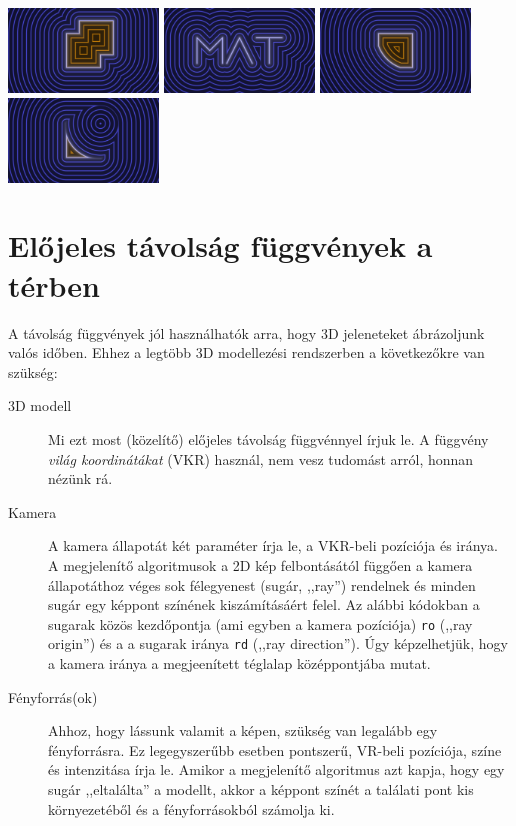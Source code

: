 \begin{center}
  \hfill
\includegraphics[width=4cm]{images/f26_a.png}\hfill
\includegraphics[width=4cm]{images/f26_aa.png}\hfill
\includegraphics[width=4cm]{images/f26_b.png}\hfill
\includegraphics[width=4cm]{images/f26_c.png}\hfill~
\end{center}

\section{Előjeles távolság függvények a térben}

A távolság függvények jól használhatók arra, hogy 3D jeleneteket ábrázoljunk valós időben.
Ehhez a legtöbb 3D modellezési rendszerben a következőkre van szükség:
\begin{description}
  \item[3D modell] Mi ezt most (közelítő) előjeles távolság függvénnyel írjuk le.
  A függvény \emph{világ koordinátákat} (VKR) használ, nem vesz tudomást arról, honnan nézünk rá.
  \item[Kamera] A kamera állapotát két paraméter írja le, a VKR-beli pozíciója és iránya.
  A megjelenítő algoritmusok a 2D kép felbontásától függően a kamera állapotáthoz véges sok félegyenest
  (sugár, ,,ray'') rendelnek és minden sugár egy képpont színének kiszámításáért felel.
  Az alábbi kódokban a sugarak közös kezdőpontja (ami egyben a kamera pozíciója) \texttt{ro} (,,ray origin'')
  és a a sugarak iránya \texttt{rd} (,,ray direction''). Úgy képzelhetjük, hogy a kamera
  iránya a megjeenített téglalap középpontjába mutat.
  \item[Fényforrás(ok)] Ahhoz, hogy lássunk valamit a képen, szükség van legalább egy fényforrásra. Ez
  legegyszerűbb esetben pontszerű, VR-beli pozíciója, színe és intenzitása írja le. Amikor a megjelenítő algoritmus
  azt kapja, hogy egy sugár ,,eltalálta'' a modellt, akkor a képpont színét a találati pont kis környezetéből
  és a fényforrásokból számolja ki.
\end{description} 


